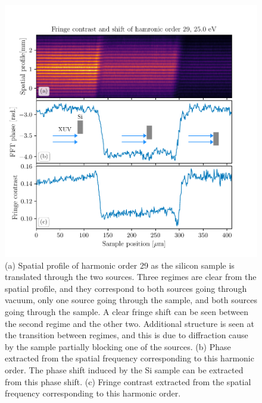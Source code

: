 \begin{figure}
	\centering
	\includegraphics[width=1.0\textwidth]{figures/refractive_index/spatialgram_fringe_shift_contrast.pdf}
	\caption[Spatial profile and fringe shift of a harmonic as sample is translated across the two XUV sources]{(a) Spatial profile of harmonic order 29 as the silicon sample is translated through the two sources. Three regimes are clear from the spatial profile, and they correspond to both sources going through vacuum, only one source going through the sample, and both sources going through the sample.  A clear fringe shift can be seen between the second regime and the other two.  Additional structure is seen at the transition between regimes, and this is due to diffraction cause by the sample partially blocking one of the sources. (b) Phase extracted from the spatial frequency corresponding to this harmonic order.  The phase shift induced by the Si sample can be extracted from this phase shift. (c) Fringe contrast extracted from the spatial frequency corresponding to this harmonic order.}
	\label{fig:harmonic_phase_shift}
\end{figure}

